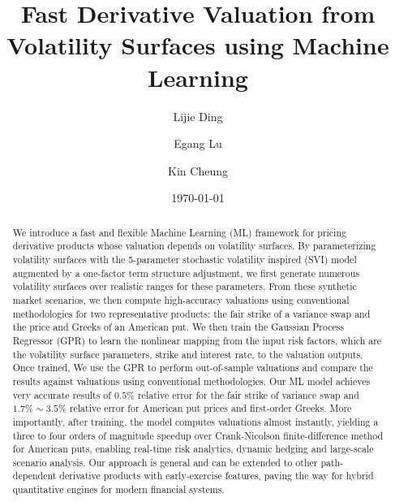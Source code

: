 \documentclass[%
 reprint,
 superscriptaddress,
nobibnotes,
 amsmath,amssymb,
 aps,
]{revtex4-2}
\begin{document}

\title{Fast Derivative Valuation from Volatility Surfaces using Machine Learning}

\author{Lijie Ding}
\author{Egang Lu}
\noaffiliation
\author{Kin Cheung}
\date{\today}%

\begin{abstract}
We introduce a fast and flexible Machine Learning (ML) framework for pricing derivative products whose valuation depends on volatility surfaces. By parameterizing volatility surfaces with the 5-parameter stochastic volatility inspired (SVI) model augmented by a one-factor term structure adjustment, we first generate numerous volatility surfaces over realistic ranges for these parameters. From these synthetic market scenarios, we then compute high-accuracy valuations using conventional methodologies for two representative products: the fair strike of a variance swap and the price and Greeks of an American put. We then train the Gaussian Process Regressor (GPR) to learn the nonlinear mapping from the input risk factors, which are the volatility surface parameters, strike and interest rate, to the valuation outputs.  Once trained, We use the GPR to perform out-of-sample valuations and compare the results against valuations using conventional methodologies. Our ML model achieves very accurate results of $0.5\%$ relative error for the fair strike of variance swap and $1.7\% \sim 3.5\%$ relative error for American put prices and first-order Greeks. More importantly, after training, the model computes valuations almost instantly, yielding a three to four orders of magnitude speedup over Crank-Nicolson finite-difference method for American puts, enabling real-time risk analytics, dynamic hedging and large-scale scenario analysis. Our approach is general and can be extended to other path-dependent derivative products with early-exercise features, paving the way for hybrid quantitative engines for modern financial systems.
\end{abstract}
\maketitle
\end{document}
